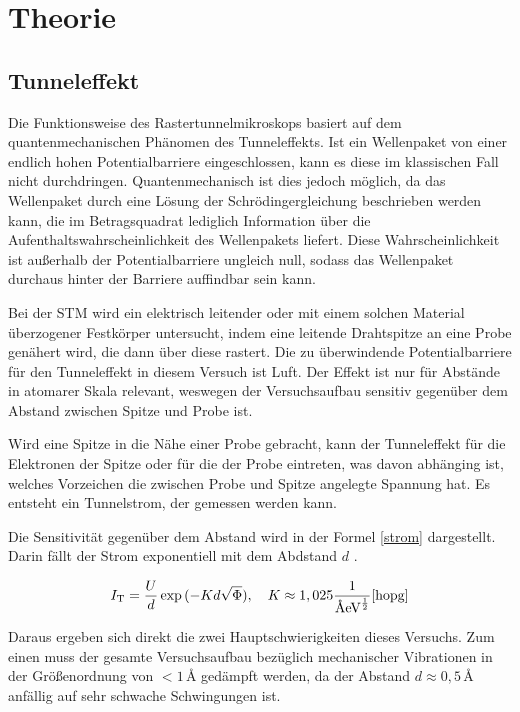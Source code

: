 \section{Theorie}
\subsection{Tunneleffekt}
Die Funktionsweise des Rastertunnelmikroskops basiert auf dem quantenmechanischen Phänomen des Tunneleffekts. Ist ein Wellenpaket von einer endlich hohen Potentialbarriere eingeschlossen, kann es diese im klassischen Fall nicht durchdringen. Quantenmechanisch ist dies jedoch möglich, da das Wellenpaket durch eine Lösung der Schrödingergleichung beschrieben werden kann, die im Betragsquadrat lediglich Information über die Aufenthaltswahrscheinlichkeit des Wellenpakets liefert. Diese Wahrscheinlichkeit ist außerhalb der Potentialbarriere ungleich null, sodass das Wellenpaket durchaus hinter der Barriere auffindbar sein kann. 

\noindent Bei der STM wird ein elektrisch leitender oder mit einem solchen Material überzogener Festkörper untersucht, indem eine leitende Drahtspitze an eine Probe genähert wird, die dann über diese rastert. Die zu überwindende Potentialbarriere für den Tunneleffekt in diesem Versuch ist Luft. Der Effekt ist nur für Abstände in atomarer Skala relevant, weswegen der Versuchsaufbau sensitiv gegenüber dem Abstand zwischen Spitze und Probe ist.

\noindent Wird eine Spitze in die Nähe einer Probe gebracht, kann der Tunneleffekt für die Elektronen der Spitze oder für die der Probe eintreten, was davon abhänging ist, welches Vorzeichen die zwischen Probe und Spitze angelegte Spannung hat. Es entsteht ein Tunnelstrom, der gemessen werden kann.

\noindent Die Sensitivität gegenüber dem Abstand wird in der Formel \eqref{strom} dargestellt. Darin fällt der Strom exponentiell mit dem Abdstand \(d\) .

\begin{equation} 
\label{strom}
I_\text{T}=\frac{U}{d}\exp{(-Kd\sqrt{\Phi})},\quad K\approx1,025\frac{1}{\text{\r{A}}\text{eV}^\frac12}
\cite{hopg}
\end{equation}

\noindent Daraus ergeben sich direkt die zwei Hauptschwierigkeiten dieses Versuchs. Zum einen muss der gesamte Versuchsaufbau bezüglich mechanischer Vibrationen in der Größenordnung von \(<1\)\,\r{A} gedämpft werden, da der Abstand \(d\approx0,5\)\,\r{A} \cite{hopg} anfällig auf sehr schwache Schwingungen ist.  

